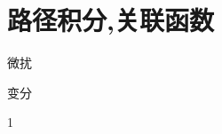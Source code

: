\ifx\allfiles\undefined



	\else
	\fi
\chapter{路径积分,关联函数}
\begin{introduction}
	\item 微扰
	\item 变分
\end{introduction}
1

	
	
	
	
	
\ifx\allfiles\undefined

	\else
	\fi
